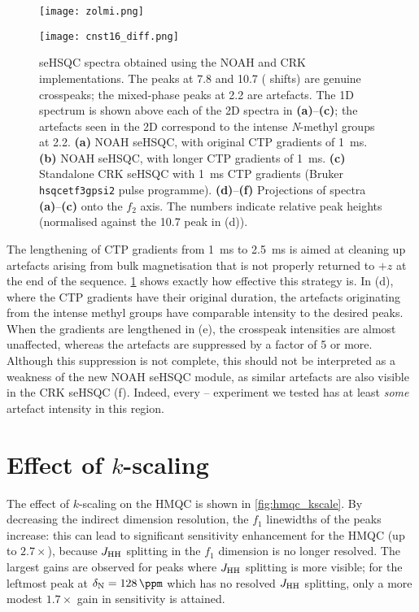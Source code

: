 \begin{figure}
    \centering
    \texttt{[image: zolmi.png]}\phantom{aaaaaa}

    \texttt{[image: cnst16\_diff.png]}
    \caption{
        \nitrogen{} seHSQC spectra obtained using the NOAH and CRK implementations.
        The peaks at 7.8 and \SI{10.7}{\ppm} (\proton{} shifts) are genuine crosspeaks; the mixed-phase peaks at \SI{2.2}{\ppm} are artefacts.
        The 1D \proton{} spectrum is shown above each of the 2D spectra in \textbf{(a)}--\textbf{(c)}; the artefacts seen in the 2D correspond to the intense \textit{N}-methyl groups at \SI{2.2}{\ppm}.
        \textbf{(a)} NOAH seHSQC, with original CTP gradients of \SI{1}{\ms}.
        \textbf{(b)} NOAH seHSQC, with longer CTP gradients of \SI{1}{\ms}.
        \textbf{(c)} Standalone CRK seHSQC with \SI{1}{\ms} CTP gradients (Bruker \texttt{hsqcetf3gpsi2} pulse programme).
        \textbf{(d)}--\textbf{(f)} Projections of spectra \textbf{(a)}--\textbf{(c)} onto the $f_2$ axis.
        The numbers indicate relative peak heights (normalised against the \SI{10.7}{\ppm} peak in (d)).
        \zolmi{}
    }
    \label{fig:cnst16_diff}
\end{figure}

The lengthening of CTP gradients from \SI{1}{\ms} to \SI{2.5}{\ms} is aimed at cleaning up artefacts arising from bulk magnetisation that is not properly returned to $+z$ at the end of the sequence.
\cref{fig:cnst16_diff} shows exactly how effective this strategy is.
In (d), where the CTP gradients have their original duration, the artefacts originating from the intense methyl groups have comparable intensity to the desired peaks.
When the gradients are lengthened in (e), the crosspeak intensities are almost unaffected, whereas the artefacts are suppressed by a factor of 5 or more.
Although this suppression is not complete, this should not be interpreted as a weakness of the new NOAH seHSQC module, as similar artefacts are also visible in the CRK seHSQC (f).
Indeed, every \nitrogen{}--\proton{} experiment we tested has at least \textit{some} artefact intensity in this region.

\section{Effect of \texorpdfstring{$k$}{k}-scaling}

The effect of $k$-scaling on the HMQC is shown in \cref{fig:hmqc_kscale}.
By decreasing the indirect dimension resolution, the $f_1$ linewidths of the peaks increase: this can lead to significant sensitivity enhancement for the HMQC (up to $2.7 \times$), because $\jhh$ splitting in the $f_1$ dimension is no longer resolved.
The largest gains are observed for peaks where $\jhh$ splitting is more visible; for the leftmost peak at $\delta_{\ce{N}} = \SI{128}{\ppm}$ which has no resolved $\jhh$ splitting, only a more modest $1.7 \times$ gain in sensitivity is attained.

